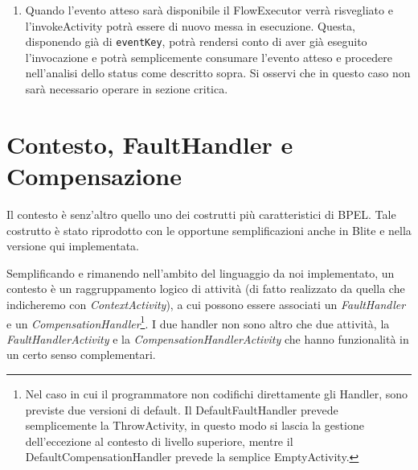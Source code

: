 \begin{enumerate}
  \item Quando l'evento atteso sarà disponibile il FlowExecutor verrà
  risvegliato e l'invokeActivity potrà essere di nuovo messa in esecuzione.
  Questa, disponendo già di \texttt{eventKey}, potrà rendersi conto di aver
  già eseguito l'invocazione e potrà semplicemente consumare l'evento
  atteso e procedere nell'analisi dello status come descritto sopra. Si
  osservi che in questo caso non sarà necessario operare in sezione critica.
\end{enumerate}

\section{Contesto, FaultHandler e Compensazione}

Il contesto è senz'altro quello uno dei costrutti più caratteristici di BPEL.
Tale costrutto \`e stato riprodotto con le opportune semplificazioni anche in
Blite e nella versione qui implementata.

Semplificando e rimanendo nell'ambito del linguaggio da noi implementato, un
contesto \`e un raggruppamento logico di attività (di fatto realizzato da
quella che indicheremo con \emph{ContextActivity}), a cui possono essere
associati un \emph{FaultHandler} e un \emph{CompensationHandler}\footnote{Nel
caso in cui il programmatore non codifichi direttamente gli Handler, sono
previste due versioni di default. Il DefaultFaultHandler prevede
semplicemente la ThrowActivity, in questo modo si lascia la gestione
dell'eccezione al contesto di livello superiore, mentre il
DefaultCompensationHandler prevede la semplice EmptyActivity.}. I due handler
non sono altro che due attività, la \emph{FaultHandlerActivity} e la \emph{CompensationHandlerActivity} che hanno funzionalità in un certo senso complementari.


